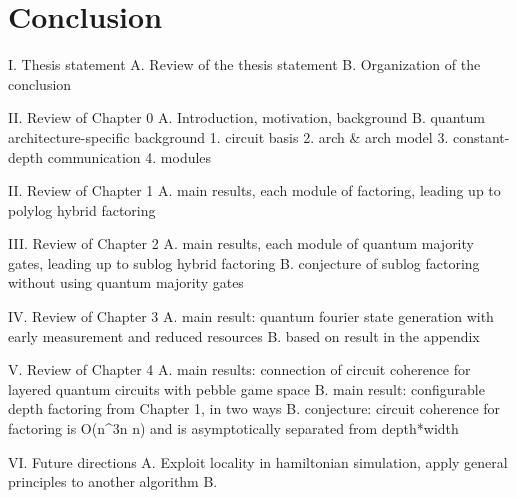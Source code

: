 \chapter{Conclusion}
\label{chap:conclude}

I. Thesis statement
	A. Review of the thesis statement
	B. Organization of the conclusion

II. Review of Chapter 0
	A. Introduction, motivation, background
	B. quantum architecture-specific background
		1. circuit basis
		2. arch & arch model
		3. constant-depth communication
		4. modules

II. Review of Chapter 1
	A. main results, each module of factoring, leading up to polylog hybrid factoring

III. Review of Chapter 2
	A. main results, each module of quantum majority gates, leading up to sublog hybrid factoring
	B. conjecture of sublog factoring without using quantum majority gates

IV. Review of Chapter 3
	A. main result: quantum fourier state generation with early measurement and reduced resources
	B. based on result in the appendix

V. Review of Chapter 4
	A. main results: connection of circuit coherence for layered quantum circuits with pebble game space
	B. main result: configurable depth factoring from Chapter 1, in two ways
	B. conjecture: circuit coherence for factoring is O(n^3\log n \log\log n) and is asymptotically separated from depth*width

VI. Future directions
	A. Exploit locality in hamiltonian simulation, apply general principles to another algorithm
	B. 